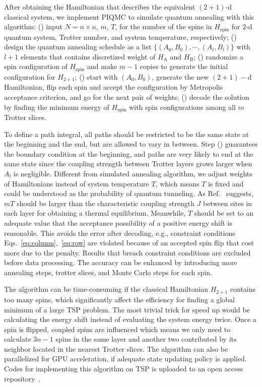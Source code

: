 \documentclass[aps,pra,twocolumn,superscriptaddress]{revtex4-2}
\begin{document}
After obtaining the Hamiltonian that describes the equivalent $(2+1)$-d classical system, we implement PIQMC to simulate quantum annealing with this algorithm: () input $N=n\times n$, $m$, $T$, for the number of the spins in $H_\text{spin}$ for $2$-d quantum system, Trotter number, and system temperature, respectively; () design the quantum annealing schedule as a list $\{(A_0,B_0),\cdots,(A_l,B_l)\}$ with $l+1$ elements that contains discretized weight of $H_\text{A}$ and $H_\text{B}$; () randomize a spin configuration of $H_\text{spin}$ and make $m-1$ copies to generate the initial configuration for $H_{2+1}$; () start with $(A_0,B_0)$, generate the new $(2+1)-$d Hamiltonian, flip each spin and accept the configuration by Metropolis acceptance criterion, and go for the next pair of weights; () decode the solution by finding the minimum energy of $H_\text{spin}$ with spin configurations among all $m$ Trotter slices. 

To define a path integral, all paths should be restricted to be the same state at the beginning and the end, but are allowed to vary in between. Step () guarantees the boundary condition at the beginning, and paths are very likely to end at the same state since the coupling strength between Trotter layers grows larger when $A_l$ is negligible. Different from simulated annealing algorithm, we adjust weights of Hamiltonians instead of system temperature $T$, which means $T$ is fixed and could be understood as the probability of quantum tunneling.  As Ref.~\cite{path_integral} suggests, $mT$ should be larger than the characteristic coupling strength $J$ between sites in each layer for obtaining a thermal equilibrium. Meanwhile, $T$ should be set to an adequate value that the acceptance possibility of a positive energy shift is reasonable. This avoids the error after decoding, e.g., constraint conditions Eqs.~\eqref{eq:column},~\eqref{eq:row} are violated because of an accepted spin flip that cost more due to the penalty. Results that breach constraint conditions are excluded before data processing. The accuracy can be enhanced by introducing more annealing steps, trotter slices, and Monte Carlo steps for each spin.

The algorithm can be time-consuming if the classical Hamiltonian $H_{2+1}$ contains too many spins, which significantly affect the efficiency for finding a global minimum of a large TSP problem. The most trivial trick for speed up would be calculating the energy shift instead of evaluating the system energy twice. Once a spin is flipped, coupled spins are influenced which means we only need to calculate $3n-1$ spins in the same layer and another two contributed by its neighbor located in the nearest Trotter slices. The algorithm can also be parallelized for GPU acceleration, if adequate state updating policy is applied. Codes for implementing this algorithm on TSP is uploaded to an open access repository~\cite{codes}.
\end{document}
